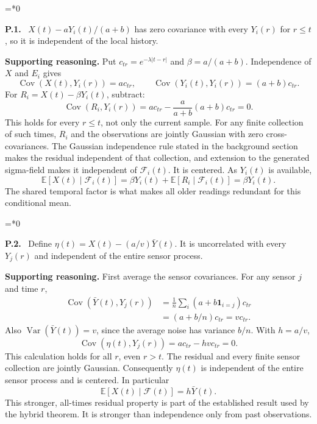 \documentclass[12pt,letterpaper]{article}
\newcommand{\E}{\mathbb E}
\newcommand{\Var}{\operatorname{Var}}
\newcommand{\Cov}{\operatorname{Cov}}
\newcommand{\F}{\mathcal F}
\newenvironment{proofstep}[2]{%
  \begin{list}{}{\leftmargin=\dimexpr 0.17in*#2\relax%
  \setlength{\rightmargin}{0pt}\setlength{\topsep}{5pt}\setlength{\parsep}{2pt}}%
  \item[]\textbf{\textcolor{ink}{#1.}}\ }{\end{list}}
\begin{document}
\begin{proofstep}{P.1}{0}
\label{step:P.1}
$X(t)-aY_i(t)/(a+b)$ has zero covariance with every $Y_i(r)$ for $r\le t$, so it is independent of the local history.

\textbf{Supporting reasoning.}
Put $c_{tr}=e^{-\lambda|t-r|}$ and $\beta=a/(a+b)$. Independence of $X$ and $E_i$ gives
\[
\Cov(X(t),Y_i(r))=a c_{tr},\qquad
\Cov(Y_i(t),Y_i(r))=(a+b)c_{tr}.
\]
For $R_i=X(t)-\beta Y_i(t)$, subtract:
\[
\Cov(R_i,Y_i(r))=a c_{tr}-\frac{a}{a+b}(a+b)c_{tr}=0.
\]
This holds for every $r\le t$, not only the current sample. For any finite collection of such times, $R_i$ and the observations are jointly Gaussian with zero cross-covariances. The Gaussian independence rule stated in the background section makes the residual independent of that collection, and extension to the generated sigma-field makes it independent of $\F_i(t)$. It is centered. As $Y_i(t)$ is available,
\[
\E[X(t)\mid\F_i(t)]=\beta Y_i(t)+\E[R_i\mid\F_i(t)]=\beta Y_i(t).
\]
The shared temporal factor is what makes all older readings redundant for this conditional mean.
\par{}
\end{proofstep}

\begin{proofstep}{P.2}{0}
\label{step:P.2}
Define $\eta(t)=X(t)-(a/v)\bar Y(t)$. It is uncorrelated with every $Y_j(r)$ and independent of the entire sensor process.

\textbf{Supporting reasoning.}
First average the sensor covariances. For any sensor $j$ and time $r$,
\begin{align*}
\Cov(\bar Y(t),Y_j(r))
&=\frac1n\sum_i(a+b\mathbf1_{i=j})c_{tr}\\
&=(a+b/n)c_{tr}=v c_{tr}.
\end{align*}
Also $\Var(\bar Y(t))=v$, since the average noise has variance $b/n$. With $h=a/v$,
\[
\Cov(\eta(t),Y_j(r))=a c_{tr}-h v c_{tr}=0.
\]
This calculation holds for all $r$, even $r>t$. The residual and every finite sensor collection are jointly Gaussian. Consequently $\eta(t)$ is independent of the entire sensor process and is centered. In particular
\[
\E[X(t)\mid\F(t)]=h\bar Y(t).
\]
This stronger, all-times residual property is part of the established result used by the hybrid theorem. It is stronger than independence only from past observations.
\par{}
\end{proofstep}
\end{document}

